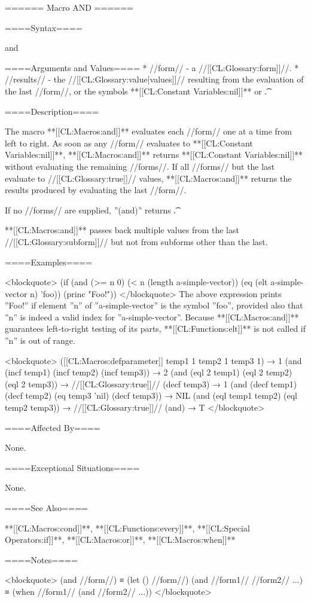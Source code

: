 ====== Macro AND ======

====Syntax====

\DefmacWithValues and {} {}

====Arguments and Values====
  * //form// - a //[[CL:Glossary:form]]//.
  * //results// - the //[[CL:Glossary:value|values]]// resulting from the evaluation of the last //form//, or the symbols **[[CL:Constant Variables:nil]]** or \t.

====Description====

The macro **[[CL:Macros:and]]** evaluates each //form// one at a time from left to right. As soon as any //form// evaluates to **[[CL:Constant Variables:nil]]**, **[[CL:Macros:and]]** returns **[[CL:Constant Variables:nil]]** without evaluating the remaining //forms//. If all //forms// but the last evaluate to //[[CL:Glossary:true]]// values, **[[CL:Macros:and]]** returns the results produced by evaluating the last //form//.

If no //forms// are supplied, ''(and)'' returns \t.

**[[CL:Macros:and]]** passes back multiple values from the last //[[CL:Glossary:subform]]// but not from subforms other than the last.

====Examples====

<blockquote> (if (and (>= n 0) (< n (length a-simple-vector)) (eq (elt a-simple-vector n) 'foo)) (princ "Foo!")) </blockquote> The above expression prints ''Foo!'' if element ''n'' of ''a-simple-vector'' is the symbol ''foo'', provided also that ''n'' is indeed a valid index for ''a-simple-vector''. Because **[[CL:Macros:and]]** guarantees left-to-right testing of its parts, **[[CL:Functions:elt]]** is not called if ''n'' is out of range.

<blockquote> ([[CL:Macros:defparameter]] temp1 1 temp2 1 temp3 1) → 1 (and (incf temp1) (incf temp2) (incf temp3)) → 2 (and (eql 2 temp1) (eql 2 temp2) (eql 2 temp3)) → //[[CL:Glossary:true]]// (decf temp3) → 1 (and (decf temp1) (decf temp2) (eq temp3 'nil) (decf temp3)) → NIL (and (eql temp1 temp2) (eql temp2 temp3)) → //[[CL:Glossary:true]]// (and) → T </blockquote>

====Affected By====

None.

====Exceptional Situations====

None.

====See Also====

**[[CL:Macros:cond]]**, **[[CL:Functions:every]]**, **[[CL:Special Operators:if]]**, **[[CL:Macros:or]]**, **[[CL:Macros:when]]**

====Notes====

<blockquote> (and //form//) ≡ (let () //form//) (and //form1// //form2// ...) ≡ (when //form1// (and //form2// ...)) </blockquote>

